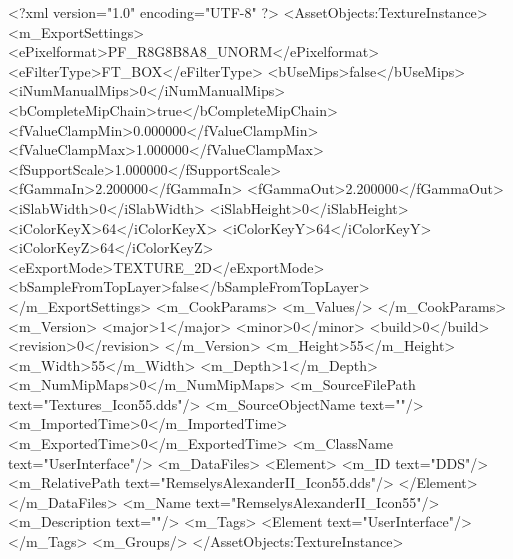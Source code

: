 <?xml version="1.0" encoding="UTF-8" ?>
<AssetObjects:TextureInstance>
	<m_ExportSettings>
		<ePixelformat>PF_R8G8B8A8_UNORM</ePixelformat>
		<eFilterType>FT_BOX</eFilterType>
		<bUseMips>false</bUseMips>
		<iNumManualMips>0</iNumManualMips>
		<bCompleteMipChain>true</bCompleteMipChain>
		<fValueClampMin>0.000000</fValueClampMin>
		<fValueClampMax>1.000000</fValueClampMax>
		<fSupportScale>1.000000</fSupportScale>
		<fGammaIn>2.200000</fGammaIn>
		<fGammaOut>2.200000</fGammaOut>
		<iSlabWidth>0</iSlabWidth>
		<iSlabHeight>0</iSlabHeight>
		<iColorKeyX>64</iColorKeyX>
		<iColorKeyY>64</iColorKeyY>
		<iColorKeyZ>64</iColorKeyZ>
		<eExportMode>TEXTURE_2D</eExportMode>
		<bSampleFromTopLayer>false</bSampleFromTopLayer>
	</m_ExportSettings>
	<m_CookParams>
		<m_Values/>
	</m_CookParams>
	<m_Version>
		<major>1</major>
		<minor>0</minor>
		<build>0</build>
		<revision>0</revision>
	</m_Version>
	<m_Height>55</m_Height>
	<m_Width>55</m_Width>
	<m_Depth>1</m_Depth>
	<m_NumMipMaps>0</m_NumMipMaps>
	<m_SourceFilePath text="Textures\RemselysAlexanderII_Icon55.dds"/>
	<m_SourceObjectName text=""/>
	<m_ImportedTime>0</m_ImportedTime>
	<m_ExportedTime>0</m_ExportedTime>
	<m_ClassName text="UserInterface"/>
	<m_DataFiles>
		<Element>
			<m_ID text="DDS"/>
			<m_RelativePath text="RemselysAlexanderII_Icon55.dds"/>
		</Element>
	</m_DataFiles>
	<m_Name text="RemselysAlexanderII_Icon55"/>
	<m_Description text=""/>
	<m_Tags>
		<Element text="UserInterface"/>
	</m_Tags>
	<m_Groups/>
</AssetObjects:TextureInstance>
